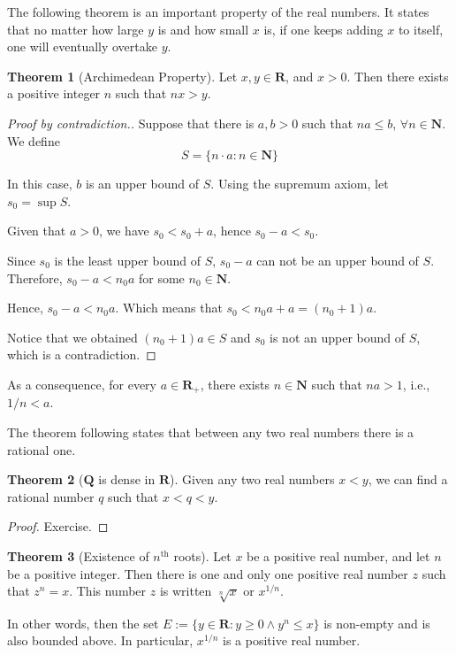 \documentclass[tikz,12pt,a4paper]{article}
\theoremstyle{definition}
\newtheorem{theorem}{Theorem}[section]
\begin{document}

The following theorem is an important property of the real numbers. It states that no matter how large $y$ is and how small $x$ is, if one keeps adding $x$ to itself, one will eventually overtake $y$.

\begin{theorem}[Archimedean Property]
  Let $x, y \in \textbf{R}$, and $x > 0$. Then there exists a positive integer $n$ such that $nx > y$.
\end{theorem}

\begin{proof}[Proof by contradiction.]
	Suppose that there is $a,b > 0$ such that $na \leq b$, $\forall n \in \textbf{N}$. We define \[ S = \{ n \cdot a : n \in \textbf{N} \} \]
	
	In this case, $b$ is an upper bound of $S$. Using the supremum axiom, let $s_0 = \sup S$.
	
	Given that $a > 0$, we have $s_0 < s_0 + a$, hence $s_0 - a < s_0$.
	
	Since $s_0$ is the least upper bound of $S$, $s_0 - a$ can not be an upper bound of $S$. Therefore, $s_0 - a < n_0 a$ for some $n_0 \in \textbf{N}$.
	
	Hence, $s_0 - a < n_0 a$. Which means that $s_0 < n_0 a + a = (n_0 + 1) a$.
	
	Notice that we obtained $(n_0 + 1)a \in S$ and $s_0$ is not an upper bound of $S$, which is a contradiction.
\end{proof}

As a consequence, for every $a \in \textbf{R}_+$, there exists $n \in \textbf{N}$ such that $n a > 1$, i.e., $1/n < a$.

The theorem following states that between any two real numbers there is a rational one.

\begin{theorem}[$\textbf{Q}$ is dense in $\textbf{R}$]
  Given any two real numbers $x < y$, we can find a rational number $q$ such that $x < q < y$.
\end{theorem}

\begin{proof} 
	Exercise. %
\end{proof}

\begin{theorem}[Existence of $n^\text{th}$ roots]
  Let $x$ be a positive real number, and let $n$ be a positive integer. Then there is one and only one positive real number $z$ such that $z^n = x$. This number $z$ is written $\sqrt[n]{x}$ or $x^{1/n}$.
  
  In other words, then the set $E := \{y \in \textbf{R} : y \geq 0 \land y^n \leq x \}$ is non-empty and is also bounded above. In particular, $x^{1/n}$ is a positive real number.
\end{theorem}
\end{document}
